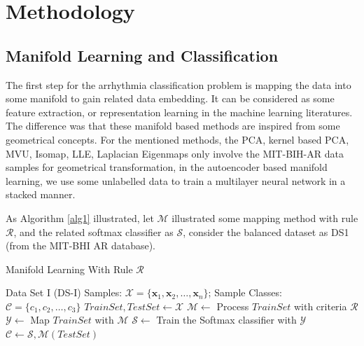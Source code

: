 \documentclass[journal]{IEEEtran}
\begin{document}
%
%


%
%

\section{Methodology}
\lipsum


     
\subsection{Manifold Learning and Classification}
The first step for the arrhythmia classification problem is mapping the data into some manifold to gain related data embedding. It can be considered as some feature extraction, or representation learning in the machine learning literatures.
The difference was that these manifold based methods are inspired from some geometrical concepts.
For the mentioned methods, the PCA, kernel based PCA, MVU, Isomap, LLE, Laplacian Eigenmaps only involve the MIT-BIH-AR data samples for geometrical transformation, in the autoencoder based manifold learning, we use some unlabelled data to train a multilayer neural network in a stacked manner.

As Algorithm \ref{alg1} illustrated, let $\mathcal{M}$ illustrated some mapping method with rule $\mathcal{R}$, and the related softmax classifier as $\mathcal{S}$, consider the balanced dataset as DS1 (from the MIT-BHI AR database). 

\begin{algorithm}
 \caption{Manifold Learning With Rule $\mathcal{R}$}
 \label{alg1}
 \begin{algorithmic}
 \REQUIRE Data Set I (DS-I) Samples: $ \mathcal{X} = \{\bm{x}_1, \bm{x}_2, \ldots, \bm{x}_n\}$;
 \ENSURE Sample Classes: $\mathcal{C} = \{c_1, c_2, \ldots, c_3\}$
 \STATE $TrainSet, TestSet \leftarrow \mathcal{X}$
 \STATE $\mathcal{M} \leftarrow $ Process $TrainSet$ with criteria $\mathcal{R}$
 \STATE $\mathcal{Y} \leftarrow$ Map $TrainSet$ with $\mathcal{M}$ 
 \STATE $\mathcal{S} \leftarrow$ Train the Softmax classifier with $\mathcal{Y}$
 \STATE $\mathcal{C} \leftarrow \mathcal{S}, \mathcal{M}(TestSet)$
  \end{algorithmic}
 \end{algorithm}
\end{document}
